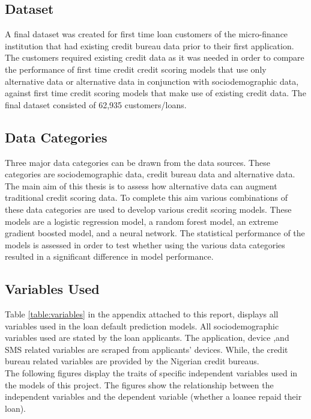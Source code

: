 \subsection{Dataset}

A final dataset was created for first time loan customers of the micro-finance institution that had existing credit bureau data prior to their first application. The customers required existing credit data as it was needed in order to compare the performance of first time credit credit scoring models that use only alternative data or alternative data in conjunction with sociodemographic data, against first time credit scoring models that make use of existing credit data. The final dataset consisted of 62,935 customers/loans. 

\subsection{Data Categories}

Three major data categories can be drawn from the data sources. These categories are sociodemographic data, credit bureau data and alternative data. The main aim of this thesis is to assess how alternative data can augment traditional credit scoring data. To complete this aim various combinations of these data categories are used to develop various credit scoring models. These models are a logistic regression model, a random forest model, an extreme gradient boosted model, and a neural network. The statistical performance of the models is assessed in order to test whether using the various data categories resulted in a significant difference in model performance. 

\subsection{Variables Used}

Table \ref{table:variables} in the appendix attached to this report, displays all variables used in the loan default prediction models. All sociodemographic variables used are stated by the loan applicants. The application, device ,and SMS related variables are scraped from applicants' devices. While, the credit bureau related variables are provided by the Nigerian credit bureaus. \\

The following figures display the traits of specific independent variables used in the models of this project. The figures show the relationship between the independent variables and the dependent variable (whether a loanee repaid their loan).  

